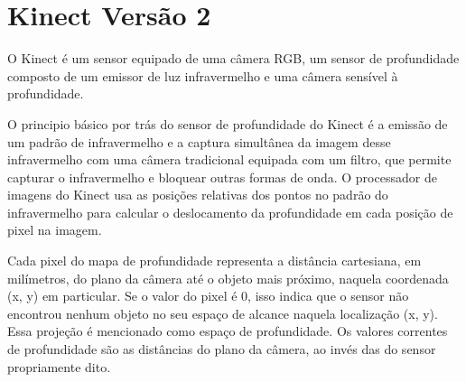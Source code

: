 \section{Kinect Vers\~ao 2} \label{sec:kinectversion2}

O Kinect é um sensor equipado de uma câmera RGB, um sensor de profundidade
composto de um emissor de luz infravermelho e uma câmera sensível à
profundidade.

O principio básico por trás do sensor de profundidade do Kinect é a emissão de
um padrão de infravermelho e a captura simultânea da imagem desse infravermelho
com uma câmera tradicional equipada com um filtro, que permite capturar o 
infravermelho e bloquear outras formas de onda. O processador de imagens do 
Kinect usa as posições relativas dos pontos 
no padrão do infravermelho para calcular o deslocamento da profundidade em cada
posição de pixel na imagem.

Cada pixel do mapa de profundidade representa a distância cartesiana, em 
milímetros, do plano da câmera até o objeto mais próximo, naquela coordenada
(x, y) em particular. Se o valor do pixel é 0, isso indica que o sensor não 
encontrou nenhum objeto no seu espaço de alcance naquela localização (x, y).
Essa projeção é mencionado como espaço de profundidade. Os valores correntes de
profundidade são as distâncias do plano da câmera, ao invés das do sensor 
propriamente dito.
